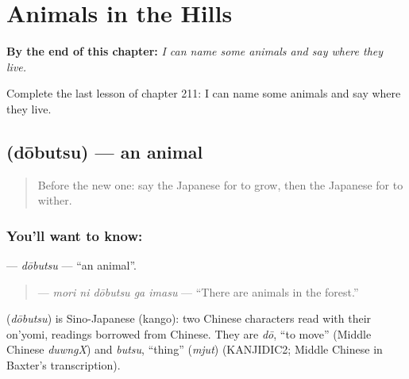 
\chapter{Animals in the Hills}
\label{ch:ja-animals-in-the-hills}

\begin{chapteropening}
\textbf{By the end of this chapter:} \emph{I can name some animals and say where they live.}

Complete the last lesson of chapter 211: I can name some animals and say where they live.
\end{chapteropening}

\section[\texorpdfstring{\ja{どうぶつ} (dōbutsu)}{どうぶつ (dōbutsu)}]{ (dōbutsu) — an animal}

\label{lesson:JA-C211-doubutsu}



\begin{quote}
Before the new one: say the Japanese for to grow, then the Japanese for to wither.
\end{quote}

\subsection*{You'll want to know: }
\textbf{} — \emph{dōbutsu} — \textquotedblleft{}an animal\textquotedblright{}.

\begin{quote}
\textbf{  } — \emph{mori ni dōbutsu ga imasu} — \textquotedblleft{}There are animals in the forest.\textquotedblright{}
\end{quote}

\begin{cousinweb}
\textbf{} (\emph{dōbutsu}) is Sino-Japanese (kango): two Chinese characters read with their on'yomi, readings borrowed from Chinese. They are \emph{dō}, \textquotedblleft{}to move\textquotedblright{} (Middle Chinese \emph{duwngX}) and \emph{butsu}, \textquotedblleft{}thing\textquotedblright{} (\emph{mjut}) (KANJIDIC2; Middle Chinese in Baxter's transcription).
\end{cousinweb}

